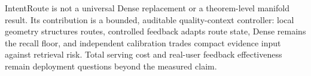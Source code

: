 IntentRoute is not a universal Dense replacement or a theorem-level manifold result. Its contribution is a bounded, auditable quality-context controller: local geometry structures routes, controlled feedback adapts route state, Dense remains the recall floor, and independent calibration trades compact evidence input against retrieval risk. Total serving cost and real-user feedback effectiveness remain deployment questions beyond the measured claim.
